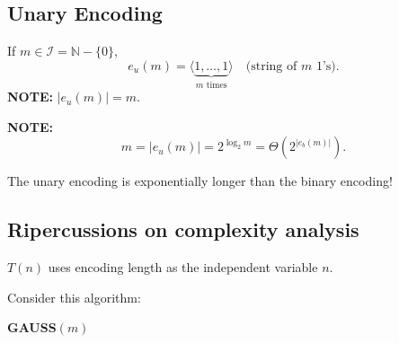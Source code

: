 \subsection{Unary Encoding}
If $m\in\mathcal I=\mathbb N-\{0\}$,
\[
e_u(m)=\langle\underbrace{1,\ldots,1}_{m\text{ times}}\rangle\quad\text{(string of }m\text{ 1's)}.
\]
\textbf{NOTE:} $|e_u(m)|=m$.

\textbf{NOTE:}
\[
m=|e_u(m)|=2^{\log_2 m}=\Theta(2^{|e_b(m)|}).
\]

The unary encoding is exponentially longer than the binary encoding!

\subsection{Ripercussions on complexity analysis}
$T(n)$ uses encoding length as the independent variable $n$.

Consider this algorithm:

\begin{notesalgorithm}
\textbf{GAUSS$(m)$}
\begin{notespseudocode}
\end{notespseudocode}
\end{notesalgorithm}
